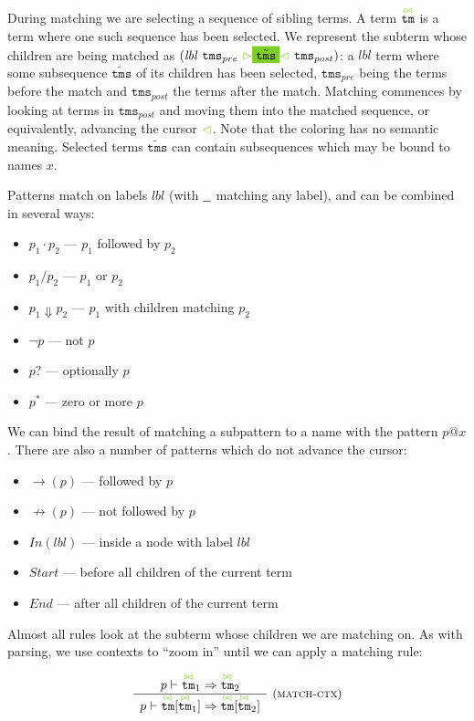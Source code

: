 \documentclass{article}
\makeatletter
\newcommand{\rulename}{\textsc}
\newcommand{\irule}[3]{\frac{\begin{array}{c}#2\end{array}}{\begin{array}{l}#3\end{array}}{~\small\mbox{(\rulename{#1})}}}
\newcommand{\cursorColor}{LimeGreen}
\newcommand{\lbl}{\ensuremath{\mathit{lbl}}}
\newcommand{\tm}{\ensuremath{\mathtt{tm}}}
\newcommand{\tms}{\ensuremath{\mathtt{tms}}}
\newcommand{\Tmc}{\ensuremath{\overset{ \textcolor{\cursorColor}{\bowtie}}{\tm}}}
\newcommand{\Tmms}{\ensuremath{\tilde{\tms}}}
\newcommand{\mstart}{\ensuremath{\textcolor{\cursorColor}{\rhd}}}
\newcommand{\mend}{\ensuremath{\textcolor{\cursorColor}{\lhd}}}
\newcommand{\select}[1]{\mstart\colorbox{\cursorColor}{$#1$}\mend}
\newcommand{\matches}[3]{\ensuremath{#1 \vdash #2 \Rightarrow #3}}
\newcommand{\pseq}[2]{\ensuremath{#1 \cdot #2}}
\newcommand{\por}[2]{\ensuremath{#1/#2}}
\newcommand{\children}[2]{\ensuremath{#1} \Downarrow #2}
\newcommand{\pnot}[1]{\ensuremath{\lnot #1}}
\newcommand{\maybe}[1]{\ensuremath{#1?}}
\newcommand{\many}[1]{\ensuremath{#1^*}}
\newcommand{\any}{\ensuremath{\text{\underline{\hspace{0.6em}}}}}
\newcommand{\bind}[2]{\ensuremath{#1@#2}}
\newcommand{\fb}[1]{\ensuremath{\rightarrow(#1)}}
\newcommand{\nfb}[1]{\ensuremath{\not\rightarrow(#1)}}
\newcommand{\pin}[1]{\ensuremath{\mathit{In}(#1)}}
\newcommand{\pstart}{\ensuremath{\mathit{Start}}}
\newcommand{\pend}{\ensuremath{\mathit{End}}}
\makeatother
\begin{document}
During matching we are selecting a sequence of sibling terms. A
term \Tmc{} is a term where one such sequence has been selected.
We represent the subterm whose children are being matched as
$(\lbl~\tms_{pre}~\select{\Tmms}~\tms_{post})$: a $\lbl$ term
where some subsequence $\Tmms$ of its children has been selected,
$\tms_{pre}$ being the terms before the match and $\tms_{post}$
the terms after the match. Matching commences by looking at terms
in $\tms_{post}$ and moving them into the matched sequence, or
equivalently, advancing the cursor $\mend$. Note that the coloring
has no semantic meaning.
%
Selected terms $\Tmms$ can contain subsequences which may be bound
to names $x$.

Patterns match on labels $\lbl$ (with $\any$ matching any label),
and can be combined in several ways:

\begin{itemize}
\item $\pseq{p_1}{p_2}$     --- $p_1$ followed by $p_2$
\item $\por{p_1}{p_2}$      --- $p_1$ or $p_2$
\item $\children{p_1}{p_2}$ --- $p_1$ with children matching $p_2$
\item $\pnot{p}$            --- not $p$
\item $\maybe{p}$           --- optionally $p$
\item $\many{p}$            --- zero or more $p$
\end{itemize}

We can bind the result of matching a subpattern to a name with
the pattern $\bind{p}{x}$. There are also a number of patterns
which do not advance the cursor:

\begin{itemize}
\item $\fb{p}$     --- followed by $p$
\item $\nfb{p}$    --- not followed by $p$
\item $\pin{\lbl}$ --- inside a node with label $\lbl$
\item $\pstart{}$  --- before all children of the current term
\item $\pend{}$    --- after all children of the current term
\end{itemize}

Almost all rules look at the subterm whose children we are
matching on. As with parsing, we use contexts to ``zoom in'' until
we can apply a matching rule:

\[
  \begin{array}{c}
    \irule{match-ctx}{
    \matches{p}{\Tmc_1}{\Tmc_2}
    }{
    \matches{p}{\Tmc[\Tmc_1]}{\Tmc[\Tmc_2]}
    }
  \end{array}
\]
\end{document}
